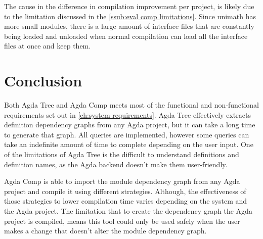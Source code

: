 The cause in the difference in compilation improvement per project, is likely
due to the limitation discussed in the \cref{ssub:eval comp
limitations}. Since unimath has more small modules, there is a large amount of
interface files that are constantly being loaded and unloaded when normal
compilation can load all the interface files at once and keep them. 

\section{Conclusion}

Both Agda Tree and Agda Comp meets most of the functional and non-functional
requirements set out in \cref{ch:system requirements}. Agda Tree
effectively extracts definition dependency graphs from any Agda project, but it
can take a long time to generate that graph. All queries are implemented,
however some queries can take an indefinite amount of time to complete
depending on the user input. One of the limitations of Agda Tree is the
difficult to understand definitions and definition names, as the Agda backend
doesn't make them user-friendly.

Agda Comp is able to import the module dependency graph from any Agda project
and compile it using different strategies. Although, the effectiveness of those
strategies to lower compilation time varies depending on the system and the
Agda project. The limitation that to create the dependency graph the Agda
project is compiled, means this tool could only be used safely when the user
makes a change that doesn't alter the module dependency graph.




